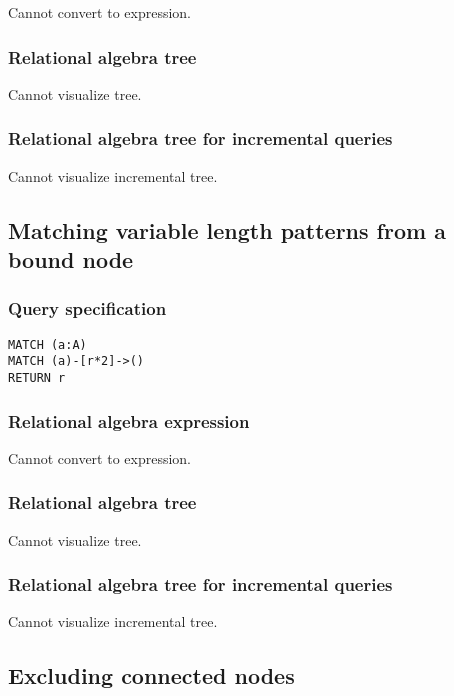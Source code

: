 Cannot convert to expression.

\subsubsection*{Relational algebra tree}

Cannot visualize tree.

\subsubsection*{Relational algebra tree for incremental queries}

Cannot visualize incremental tree.

\subsection{Matching variable length patterns from a bound node}

\subsubsection*{Query specification}

\begin{lstlisting}
MATCH (a:A)
MATCH (a)-[r*2]->()
RETURN r
\end{lstlisting}

\subsubsection*{Relational algebra expression}

Cannot convert to expression.

\subsubsection*{Relational algebra tree}

Cannot visualize tree.

\subsubsection*{Relational algebra tree for incremental queries}

Cannot visualize incremental tree.

\subsection{Excluding connected nodes}

